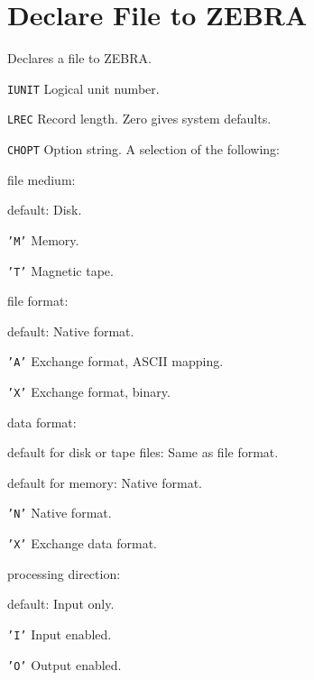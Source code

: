 \section{Declare File to ZEBRA}
\label{FZFILE}
Declares a file to ZEBRA.
\begin{mylist}
\item[\tt IUNIT]
    Logical unit number.
\item[\tt LREC]
    Record length. Zero gives system defaults.
\item[\tt CHOPT]
    Option string. A selection of the following:
    \begin{mylist}
    \item[file medium:]
        \begin{mylist}
        \item[default:]
            Disk.
        \item[\tt 'M']
            Memory.
        \item[\tt 'T']
            Magnetic tape.
        \end{mylist}
    \item[file format:]
        \begin{mylist}
        \item[default:]
            Native format.
        \item[\tt 'A']
            Exchange format, ASCII mapping.
        \item[\tt 'X']
            Exchange format, binary.
        \end{mylist}
    \item[data format:]
        \begin{mylist}
        \item[default for disk or tape files:]
            Same as file format.
        \item[default for memory:]
            Native format.
        \item[\tt 'N']
            Native format.
        \item[\tt 'X']
            Exchange data format.
        \end{mylist}
    \item[processing direction:]
        \begin{mylist}
        \item[default:]
            Input only.
        \item[\tt 'I']
            Input enabled.
        \item[\tt 'O']
            Output enabled.

\end{mylist}
\end{mylist}
\end{mylist}
